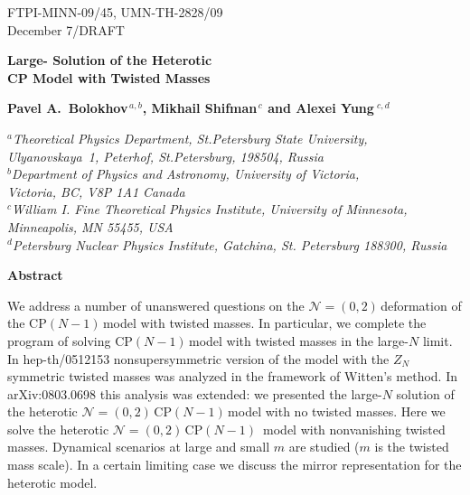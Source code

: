 \documentclass[epsfig,12pt]{article}
\newcommand{\nzt}{${\mathcal N}=(0,2)\,$}
\newcommand{\cpn}{CP$(N-1)\,$}
\begin{document}


\begin{titlepage}

\begin{flushright}
FTPI-MINN-09/45, UMN-TH-2828/09\\
December 7/DRAFT
\end{flushright}

\vspace{1cm}

\begin{center}
{  \Large \bf  Large- Solution of the Heterotic\\[2mm]
 CP Model with Twisted Masses}
\end{center}



\vspace{1mm}

\begin{center}

 {\large
 \bf   Pavel A.~Bolokhov$^{\,a,b}$,  Mikhail Shifman$^{\,c}$ and \bf Alexei Yung$^{\,\,c,d}$}
\end {center}

\begin{center}

$^a${\it Theoretical Physics Department, St.Petersburg State University, Ulyanovskaya~1, 
	 Peterhof, St.Petersburg, 198504, Russia}\\
$^b${\it Department of Physics and Astronomy, University of Victoria,\\
    Victoria, BC, V8P 1A1 Canada}\\
$^c${\it  William I. Fine Theoretical Physics Institute,
University of Minnesota,
Minneapolis, MN 55455, USA}\\
$^{d}${\it Petersburg Nuclear Physics Institute, Gatchina, St. Petersburg
188300, Russia
}
\end{center}


\begin{center}
{\large\bf Abstract}
\end{center}
We address a number of unanswered questions on the \nzt deformation of the \cpn model with
twisted masses.  In particular, we
complete the program of solving \cpn model with twisted masses in the large-$N$
limit. In hep-th/0512153 nonsupersymmetric version of the model with the $Z_N$
symmetric twisted masses was analyzed in the framework of Witten's method. In arXiv:0803.0698 
this analysis was extended: we presented the 
large-$N$ solution of the heterotic \nzt \cpn model with no twisted masses.
Here we solve the heterotic \nzt \mbox{\cpn}  model with nonvanishing twisted
masses. Dynamical scenarios at large and small $m$ are studied
($m$ is the twisted mass scale).
In a certain limiting case we discuss the mirror representation for the heterotic model.

\vspace{2cm}




\end{titlepage}
\end{document}
